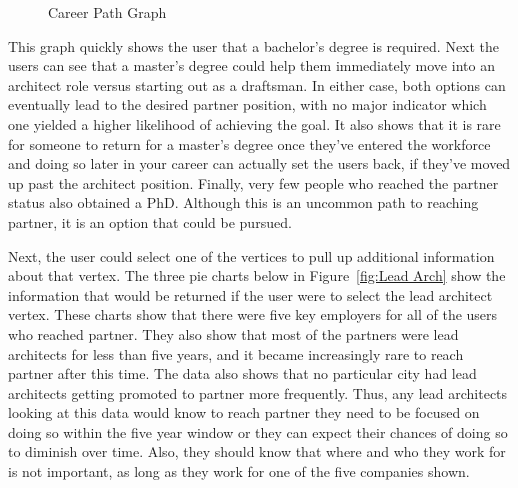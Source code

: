 \begin{figure}[H]
{
}

	\caption{Career Path Graph}
	\label{fig:partner nodal map}
\end{figure}

This graph quickly shows the user that a bachelor's degree is required.  Next
the users can see that a master's degree could help them immediately move into
an architect role versus starting out as a draftsman.  In either case, both
options can eventually lead to the desired partner position, with no major
indicator which one yielded a higher likelihood of achieving the goal.  It also
shows that it is rare for someone to return for a master's degree once they've
entered the workforce and doing so later in your career can actually set the
users back, if they've moved up past the architect position.  Finally, very
few people who reached the partner status also obtained a PhD.  Although this is
an uncommon path to reaching partner, it is an option that could be pursued.

Next, the user could select one of the vertices to pull up additional
information about that vertex.  The three pie charts below in
Figure~\ref{fig:Lead Arch} show the information that would be returned if the user were to select the lead
architect vertex.  These charts show that there were five key employers for all of
the users who reached partner.  They also show that most of the partners were
lead architects for less than five years, and it became increasingly rare to
reach partner after this time.  The data also shows that no particular city had
lead architects getting promoted to partner more frequently.  Thus, any lead
architects looking at this data would know to reach partner they need to be
focused on doing so within the five year window or they can expect their chances
of doing so to diminish over time.  Also, they should know that where and who
they work for is not important, as long as they work for one of the five
companies shown.

